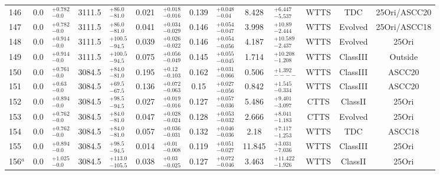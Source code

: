 \documentclass[12pt]{article}
\begin{document}
\begin{table}
\begin{threeparttable}
\begin{tabular}{lclclclclclccc}
 	146         & 0.0   & $^{+0.782}_{-0.0  }$ & 3111.5 & $^{+86.0  }_{-81.0 }$ & 0.021 & $^{+0.018 }_{-0.016}$ & 0.139 & $^{+0.048 }_{-0.04 }$ & 8.428  & $^{+6.447  }_{-5.537}$  & WTTS & TDC      & 25Ori/ASCC20  \\
 	147         & 0.0   & $^{+0.782}_{-0.0  }$ & 3111.5 & $^{+86.0  }_{-81.0 }$ & 0.041 & $^{+0.034 }_{-0.029}$ & 0.146 & $^{+0.054 }_{-0.047}$ & 3.998  & $^{+10.89  }_{-2.444}$  & WTTS & Evolved  & 25Ori/ASCC18  \\
 	148         & 0.0   & $^{+0.914}_{-0.0  }$ & 3111.5 & $^{+100.5 }_{-94.5 }$ & 0.039 & $^{+0.026 }_{-0.022}$ & 0.146 & $^{+0.054 }_{-0.056}$ & 4.187  & $^{+10.589 }_{-2.437}$  & WTTS & Evolved  & 25Ori         \\
 	149         & 0.0   & $^{+0.914}_{-0.0  }$ & 3111.5 & $^{+100.5 }_{-94.5 }$ & 0.075 & $^{+0.056 }_{-0.049}$ & 0.145 & $^{+0.055 }_{-0.045}$ & 1.714  & $^{+10.208 }_{-1.208}$  & WTTS & ClassIII & Outside       \\
 	150         & 0.0   & $^{+0.761}_{-0.0  }$ & 3084.5 & $^{+84.0  }_{-81.0 }$ & 0.195 & $^{+0.12  }_{-0.103}$ & 0.162 & $^{+0.031 }_{-0.066}$ & 0.506  & $^{+1.392  }_{----  }$  & WTTS & ClassIII & ASCC20        \\
 	151         & 0.0   & $^{+0.63 }_{-0.0  }$ & 3084.5 & $^{+69.5  }_{-67.5 }$ & 0.136 & $^{+0.072 }_{-0.063}$ & 0.15  & $^{+0.027 }_{-0.056}$ & 0.842  & $^{+1.545  }_{-0.334}$  & WTTS & ClassIII & ASCC20        \\
 	152         & 0.0   & $^{+0.894}_{-0.0  }$ & 3084.5 & $^{+98.5  }_{-94.5 }$ & 0.027 & $^{+0.019 }_{-0.016}$ & 0.127 & $^{+0.057 }_{-0.036}$ & 5.486  & $^{+9.401  }_{-3.097}$  & CTTS & ClassII  & 25Ori         \\
 	153         & 0.0   & $^{+0.762}_{-0.0  }$ & 3084.5 & $^{+84.0  }_{-81.0 }$ & 0.047 & $^{+0.028 }_{-0.024}$ & 0.128 & $^{+0.053 }_{-0.032}$ & 2.666  & $^{+8.041  }_{-1.183}$  & CTTS & Evolved  & 25Ori         \\
 	154         & 0.0   & $^{+0.762}_{-0.0  }$ & 3084.5 & $^{+84.0  }_{-81.0 }$ & 0.057 & $^{+0.036 }_{-0.031}$ & 0.132 & $^{+0.046 }_{-0.036}$ & 2.18   & $^{+7.117  }_{-1.253}$  & WTTS & TDC      & ASCC18        \\
 	155         & 0.0   & $^{+0.894}_{-0.0  }$ & 3084.5 & $^{+98.5  }_{-94.5 }$ & 0.014 & $^{+0.01  }_{-0.008}$ & 0.119 & $^{+0.051 }_{-0.027}$ & 11.845 & $^{+3.031  }_{-7.036}$  & WTTS & ClassIII & 25Ori         \\
 	156$^a $    & 0.0   & $^{+1.025}_{-0.0  }$ & 3084.5 & $^{+113.0 }_{-105.5}$ & 0.038 & $^{+0.03  }_{-0.025}$ & 0.127 & $^{+0.072 }_{-0.046}$ & 3.463  & $^{+11.422 }_{-1.926}$  & WTTS & ClassII  & 25Ori         \\

\end{tabular}
\end{threeparttable}
\end{table}
\end{document}
